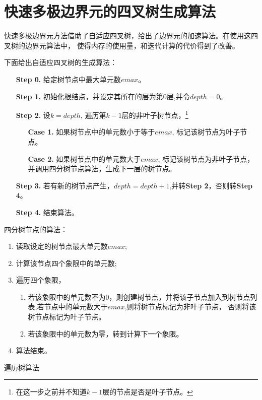 
\section{快速多极边界元的四叉树生成算法}

快速多极边界元方法借助了自适应四叉树，给出了边界元的加速算法。在使用这四叉树的边界元算法中，
使得内存的使用量，和迭代计算的代价得到了改善。

下面给出自适应四叉树的生成算法：
\begin{enumerate}
	\item [\textbf{Step 0.}] 给定树节点中最大单元数$emax$。  
	\item [\textbf{Step 1.}] 初始化根结点，并设定其所在的层为第0层,并令$depth = 0$。
	\item [\textbf{Step 2.}] 设$k = depth$, 遍历第$k-1$层的非叶子树节点，\footnote{在这一步之前并不知道$k-1$层的节点是否是叶子节点。}
		\begin{enumerate}
			\item [\textbf{Case 1.}] 如果树节点中的单元数小于等于$emax$, 标记该树节点为叶子节点。
			\item [\textbf{Case 2.}] 如果树节点中的单元数大于$emax$, 标记该树节点为非叶子节点，并调用四分树节点算法，生成下一层的树节点。
		\end{enumerate}
	\item [\textbf{Step 3.}] 若有新的树节点产生，$depth = depth +1$,并转\textbf{Step 2}，否则转\textbf{Step 4}。
	\item [\textbf{Step 4.}] 结束算法。
\end{enumerate}

四分树节点的算法：
\begin{enumerate}
	\item 读取设定的树节点最大单元数$emax$;
	\item 计算该节点四个象限中的单元数;
	\item 遍历四个象限，
		\begin{enumerate}
			\item 若该象限中的单元数不为0，则创建树节点，并将该子节点加入到树节点列表,若节点中的单元数大于$emax$,则将树节点标记为非叶子节点，
				否则将该树节点标记为叶子节点。
			\item 若该象限中的单元数为零，转到计算下一个象限。
		\end{enumerate}
	\item 算法结束。
\end{enumerate}


遍历树算法





\newpage

